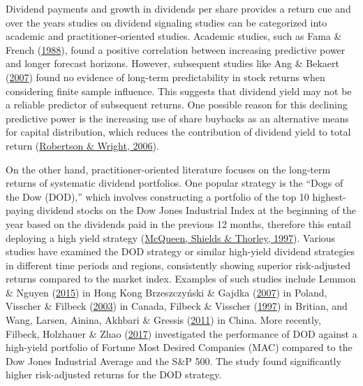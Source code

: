 \documentclass[12pt,preprint, authoryear]{elsarticle}
\numberwithin{equation}{section}
\numberwithin{figure}{section}
\numberwithin{table}{section}
\begin{document}
Dividend payments and growth in dividends per share provides a return
cue and over the years studies on dividend signaling studies can be
categorized into academic and practitioner-oriented studies. Academic
studies, such as Fama \& French
(\protect\hyperlink{ref-fama1988permanent}{1988}), found a positive
correlation between increasing predictive power and longer forecast
horizons. However, subsequent studies like Ang \& Bekaert
(\protect\hyperlink{ref-ang2007stock}{2007}) found no evidence of
long-term predictability in stock returns when considering finite sample
influence. This suggests that dividend yield may not be a reliable
predictor of subsequent returns. One possible reason for this declining
predictive power is the increasing use of share buybacks as an
alternative means for capital distribution, which reduces the
contribution of dividend yield to total return
(\protect\hyperlink{ref-robertson2006}{Robertson \& Wright, 2006}).

On the other hand, practitioner-oriented literature focuses on the
long-term returns of systematic dividend portfolios. One popular
strategy is the ``Dogs of the Dow (DOD),'' which involves constructing a
portfolio of the top 10 highest-paying dividend stocks on the Dow Jones
Industrial Index at the beginning of the year based on the dividends
paid in the previous 12 months, therefore this entail deploying a high
yield strategy (\protect\hyperlink{ref-mcqueen1997does}{McQueen, Shields
\& Thorley, 1997}). Various studies have examined the DOD strategy or
similar high-yield dividend strategies in different time periods and
regions, consistently showing superior risk-adjusted returns compared to
the market index. Examples of such studies include Lemmon \& Nguyen
(\protect\hyperlink{ref-lemmon2015dividend}{2015}) in Hong Kong
Brzeszczyński \& Gajdka
(\protect\hyperlink{ref-brzeszczynski2007dividend}{2007}) in Poland,
Visscher \& Filbeck (\protect\hyperlink{ref-visscher2003dividend}{2003})
in Canada, Filbeck \& Visscher
(\protect\hyperlink{ref-filbeck1997}{1997}) in Britian, and Wang,
Larsen, Ainina, Akhbari \& Gressis
(\protect\hyperlink{ref-wang2011dogs}{2011}) in China. More recently,
Filbeck, Holzhauer \& Zhao
(\protect\hyperlink{ref-filbeck2017dividend}{2017}) investigated the
performance of DOD against a high-yield portfolio of Fortune Most
Desired Companies (MAC) compared to the Dow Jones Industrial Average and
the S\&P 500. The study found significantly higher risk-adjusted returns
for the DOD strategy.

\newpage
\end{document}
